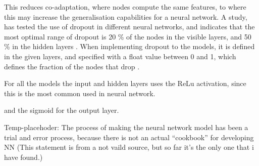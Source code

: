 This reduces co-adaptation, where nodes compute the same features, to where this may increase the generalisation capabilities for a neural network.\citep{Srivastava2014}  
A study, has tested the use of dropout in different neural networks, and indicates that the most optimal range of dropout is 20 \% of the nodes in the visible layers, and 50 \% in the hidden layers \citep{Srivastava2014}.
When implementing dropout to the models, it is defined in the given layers, and specified with a float value between 0 and 1, which defines the fraction of the nodes that drop \citep{Chollet2015}.








For all the models the input and hidden layers uses the ReLu activation, since this is the most common used in neural network. \citep{Goodfellow2016} %

and the sigmoid for the output layer.  




Temp-placehoder:
The process of making the neural network model has been a trial and error process, because there is not an actual “cookbook” for developing NN (This statement is from a not vaild source, but so far it’s the only one that i have found.) \citep{Goodfellow2016} 
